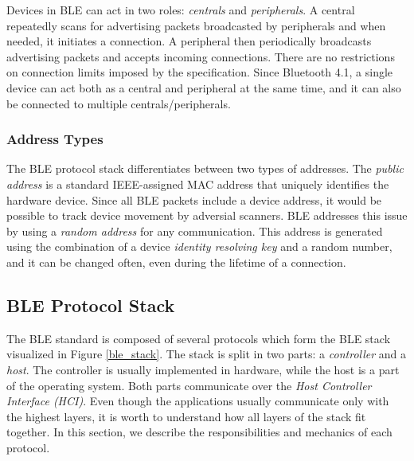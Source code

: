 Devices in BLE can act in two roles: \textit{centrals} and \textit{peripherals}. A central repeatedly scans for advertising packets broadcasted by peripherals and when needed, it initiates a connection. A peripheral then periodically broadcasts advertising packets and accepts incoming connections. There are no restrictions on connection limits imposed by the specification. Since Bluetooth 4.1, a single device can act both as a central and peripheral at the same time, and it can also be connected to multiple centrals/peripherals.

\subsubsection{Address Types}

The BLE protocol stack differentiates between two types of addresses. The \textit{public address} is a standard IEEE-assigned MAC address that uniquely identifies the hardware device. Since all BLE packets include a device address, it would be possible to track device movement by adversial scanners. BLE addresses this issue by using a \textit{random address} for any communication. This address is generated using the combination of a device \textit{identity resolving key} and a random number, and it can be changed often, even during the lifetime of a connection.


\iffalse
\subsection{BLE Protocol Stack}

The BLE standard is composed of several protocols which form the BLE stack visualized in Figure \ref{ble_stack}. The stack is split in two parts: a \textit{controller} and a \textit{host}. The controller is usually implemented in hardware, while the host is a part of the operating system. Both parts communicate over the \textit{Host Controller Interface (HCI)}. Even though the applications usually communicate only with the highest layers, it is worth to understand how all layers of the stack fit together. In this section, we describe the responsibilities and mechanics of each protocol.


